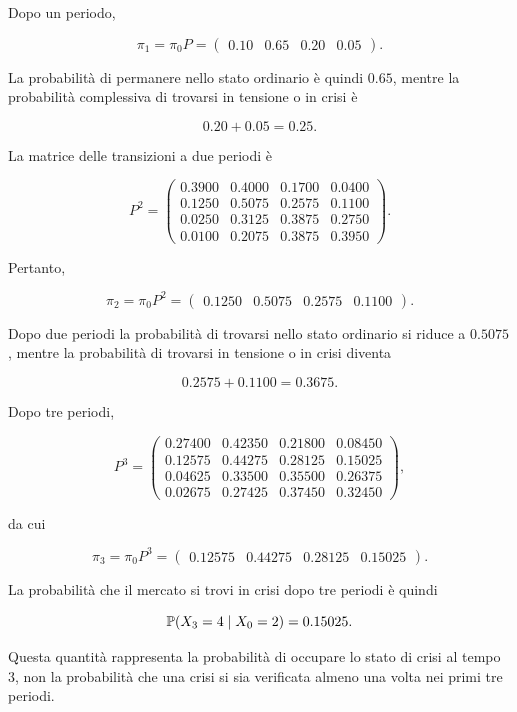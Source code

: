 Dopo un periodo,

\[
\pi_1
=
\pi_0P
=
\begin{pmatrix}
0.10&0.65&0.20&0.05
\end{pmatrix}.
\]

La probabilit\`{a} di permanere nello stato ordinario \`{e} quindi
\(0.65\), mentre la probabilit\`{a} complessiva di trovarsi in tensione
o in crisi \`{e}

\[
0.20+0.05=0.25.
\]

La matrice delle transizioni a due periodi \`{e}

\[
P^2
=
\begin{pmatrix}
0.3900 & 0.4000 & 0.1700 & 0.0400\\
0.1250 & 0.5075 & 0.2575 & 0.1100\\
0.0250 & 0.3125 & 0.3875 & 0.2750\\
0.0100 & 0.2075 & 0.3875 & 0.3950
\end{pmatrix}.
\]

Pertanto,

\[
\pi_2
=
\pi_0P^2
=
\begin{pmatrix}
0.1250&0.5075&0.2575&0.1100
\end{pmatrix}.
\]

Dopo due periodi la probabilit\`{a} di trovarsi nello stato ordinario
si riduce a \(0.5075\), mentre la probabilit\`{a} di trovarsi in
tensione o in crisi diventa

\[
0.2575+0.1100=0.3675.
\]

Dopo tre periodi,

\[
P^3
=
\begin{pmatrix}
0.27400 & 0.42350 & 0.21800 & 0.08450\\
0.12575 & 0.44275 & 0.28125 & 0.15025\\
0.04625 & 0.33500 & 0.35500 & 0.26375\\
0.02675 & 0.27425 & 0.37450 & 0.32450
\end{pmatrix},
\]

da cui

\[
\pi_3
=
\pi_0P^3
=
\begin{pmatrix}
0.12575&0.44275&0.28125&0.15025
\end{pmatrix}.
\]

La probabilit\`{a} che il mercato si trovi in crisi dopo tre periodi
\`{e} quindi

\[
\mathbb{P}(X_3=4\mid X_0=2)=0.15025.
\]

Questa quantit\`{a} rappresenta la probabilit\`{a} di occupare lo stato
di crisi al tempo \(3\), non la probabilit\`{a} che una crisi si sia
verificata almeno una volta nei primi tre periodi.

